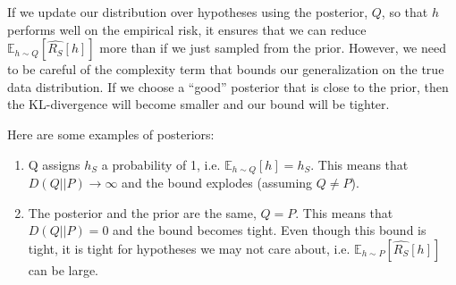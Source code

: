 \documentclass{article}
\begin{document}
If we update our distribution over hypotheses using the posterior, $Q$, so that $h$ performs well on the empirical risk, it ensures that we can reduce $\mathbb{E}_{h\sim Q}[\hat{R_S}[h]]$ more than if we just sampled from the prior. However, we need to be careful of the complexity term that bounds our generalization on the true data distribution. If we choose a ``good'' posterior that is close to the prior, then the KL-divergence will become smaller and our bound will be tighter. 

Here are some examples of posteriors:
\begin{enumerate}
    \item Q assigns $h_S$ a probability of 1, i.e. $\mathbb{E}_{h\sim Q}[h] = h_S$. This means that $D(Q||P)\rightarrow \infty$ and the bound explodes (assuming $Q \neq P$).
    \item The posterior and the prior are the same, $Q=P$. This means that $D(Q||P)=0$ and the bound becomes tight. Even though this bound is tight, it is tight for hypotheses we may not care about, i.e. $\mathbb{E}_{h\sim P}[\hat{R_S}[h]]$ can be large.
\end{enumerate}


\vspace{0.5cm}


\end{document}
